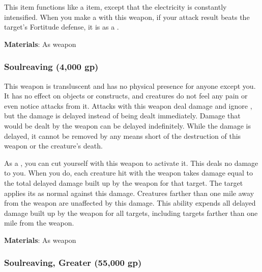 This item functions like a  item, except that the electricity is constantly intensified.
When you make a  with this weapon, if your attack result beats the target's Fortitude defense, it is \dazed as a .



\vspace{0.25em}
\textbf{Materials}: As weapon


\lowercase{\hypertarget{item:Soulreaving}{}}\label{item:Soulreaving}
\hypertarget{item:Soulreaving}{\subsubsection{Soulreaving\hfill{} (4,000 gp)}}

This weapon is transluscent and has no physical presence for anyone except you.
It has no effect on objects or constructs, and creatures do not feel any pain or even notice attacks from it.
Attacks with this weapon deal  damage and ignore , but the damage is delayed instead of being dealt immediately.
Damage that would be dealt by the weapon can be delayed indefinitely.
While the damage is delayed, it cannot be removed by any means short of the destruction of this weapon or the creature's death.

As a , you can cut yourself with this weapon to activate it.
This deals no damage to you.
When you do, each creature hit with the weapon takes  damage equal to the total delayed damage built up by the weapon for that target.
The target applies its  as normal against this damage.
Creatures farther than one mile away from the weapon are unaffected by this damage.
This ability expends all delayed damage built up by the weapon for all targets, including targets farther than one mile from the weapon.



\vspace{0.25em}
\textbf{Materials}: As weapon


\lowercase{\hypertarget{item:Soulreaving, Greater}{}}\label{item:Soulreaving, Greater}
\hypertarget{item:Soulreaving, Greater}{\subsubsection{Soulreaving, Greater\hfill{} (55,000 gp)}}

